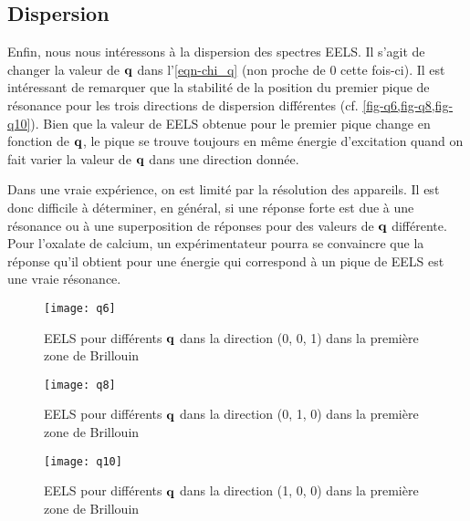 \subsection{Dispersion}
Enfin, nous nous intéressons à la dispersion des spectres EELS\@.
Il s'agit de changer la valeur de $\vb{q}$ dans l'\cref{eqn-chi_q} (non proche de 0 cette fois-ci).
Il est intéressant de remarquer que la stabilité de la position du premier pique de résonance
pour les trois directions de dispersion différentes (cf. \cref{fig-q6,fig-q8,fig-q10}).
Bien que la valeur de EELS obtenue pour le premier pique change en fonction de $\vb{q}$,
le pique se trouve toujours en même énergie d'excitation
quand on fait varier la valeur de $\vb{q}$ dans une direction donnée.

Dans une vraie expérience, on est limité par la résolution des appareils.
Il est donc difficile à déterminer, en général, si une réponse forte est due
à une résonance ou à une superposition de réponses pour des valeurs de $\vb{q}$ différente.
Pour l'oxalate de calcium, un expérimentateur pourra se convaincre que la réponse qu'il obtient
pour une énergie qui correspond à un pique de EELS est une vraie résonance.

\begin{figure}[!h]
    \centering
    \texttt{[image: q6]}
    \captionsetup{width=0.6\textwidth}
    \caption{EELS pour différents $\vb{q}$ dans la direction (0, 0, 1) dans la première zone de Brillouin}\label{fig-q6}
\end{figure}
\clearpage
\begin{figure}[!htb]
    \centering
    \texttt{[image: q8]}
    \captionsetup{width=0.6\textwidth}
    \caption{EELS pour différents $\vb{q}$ dans la direction (0, 1, 0) dans la première zone de Brillouin}\label{fig-q8}
\end{figure}

\begin{figure}[!htb]
    \centering
    \texttt{[image: q10]}
    \captionsetup{width=0.6\textwidth}
    \caption{EELS pour différents $\vb{q}$ dans la direction (1, 0, 0) dans la première zone de Brillouin}\label{fig-q10}
\end{figure}
